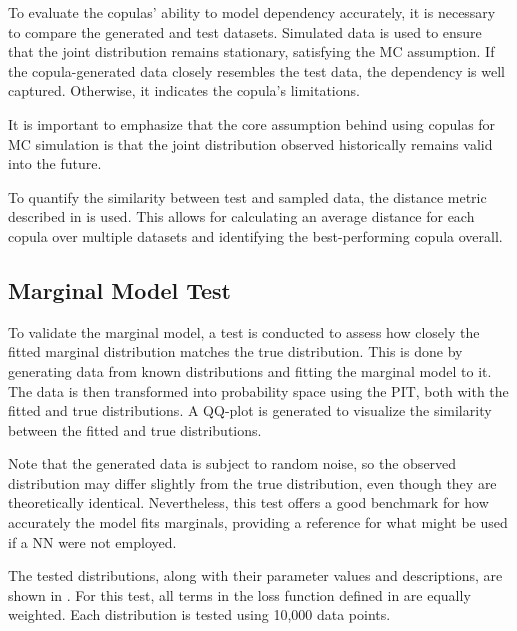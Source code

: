 To evaluate the copulas’ ability to model dependency accurately, it is necessary to compare the generated and test datasets. Simulated data is used to ensure that the joint distribution remains stationary, satisfying the \gls{MC} assumption. If the copula-generated data closely resembles the test data, the dependency is well captured. Otherwise, it indicates the copula’s limitations.

It is important to emphasize that the core assumption behind using copulas for \gls{MC} simulation is that the joint distribution observed historically remains valid into the future.

To quantify the similarity between test and sampled data, the distance metric described in  is used. This allows for calculating an average distance for each copula over multiple datasets and identifying the best-performing copula overall.

\subsection{Marginal Model Test}
To validate the marginal model, a test is conducted to assess how closely the fitted marginal distribution matches the true distribution. This is done by generating data from known distributions and fitting the marginal model to it. The data is then transformed into probability space using the \gls{PIT}, both with the fitted and true distributions. A QQ-plot is generated to visualize the similarity between the fitted and true distributions. 

Note that the generated data is subject to random noise, so the observed distribution may differ slightly from the true distribution, even though they are theoretically identical. Nevertheless, this test offers a good benchmark for how accurately the model fits marginals, providing a reference for what might be used if a \gls{NN} were not employed.

The tested distributions, along with their parameter values and descriptions, are shown in . For this test, all terms in the loss function defined in  are equally weighted. Each distribution is tested using 10,000 data points.

